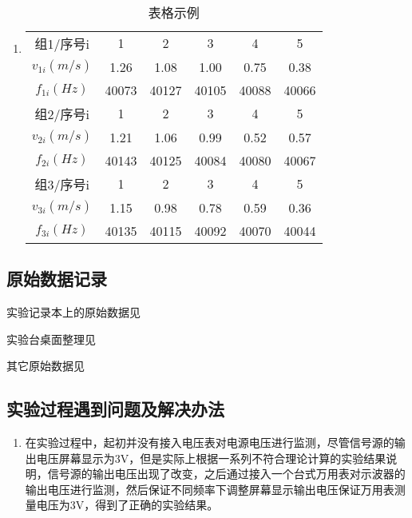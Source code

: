 \documentclass[dvipsnames, svgnames,a4paper,11pt]{article}
\begin{document}
	\subsubsection{}
	\begin{enumerate}
		\item \begin{table}[h]
			\centering
			\caption{表格示例}
			\label{tab:tab1}
			\begin{tabular}{|c|c|c|c|c|c|}
				\hline
				组1/序号i & 1 & 2 & 3 & 4 & 5 \\
				$v_{1i}(m/s)$ & 1.26 & 1.08 & 1.00 & 0.75 & 0.38 \\
				$f_{1i}(Hz)$ & 40073 & 40127 & 40105 & 40088 & 40066 \\
				\hline
				组2/序号i & 1 & 2 & 3 & 4 & 5 \\
				$v_{2i}(m/s)$ & 1.21 & 1.06 & 0.99 & 0.52 & 0.57 \\
				$f_{2i}(Hz)$ & 40143 & 40125 & 40084 & 40080 & 40067 \\
				\hline
				组3/序号i & 1 & 2 & 3 & 4 & 5 \\
				$v_{3i}(m/s)$ & 1.15 & 0.98 & 0.78 & 0.59 & 0.36 \\
				$f_{3i}(Hz)$ & 40135 & 40115 & 40092 & 40070 & 40044 \\
				\hline
			\end{tabular}
		\end{table}		
	\end{enumerate}
	
	
	\clearpage
	\subsection{原始数据记录}
	实验记录本上的原始数据见%
	
	实验台桌面整理见%
	
	其它原始数据见%
	
	\subsection{实验过程遇到问题及解决办法}
	\begin{enumerate}
		\item 在实验过程中，起初并没有接入电压表对电源电压进行监测，尽管信号源的输出电压屏幕显示为3V，但是实际上根据一系列不符合理论计算的实验结果说明，信号源的输出电压出现了改变，之后通过接入一个台式万用表对示波器的输出电压进行监测，然后保证不同频率下调整屏幕显示输出电压保证万用表测量电压为3V，得到了正确的实验结果。
	\end{enumerate}
	
\end{document}
